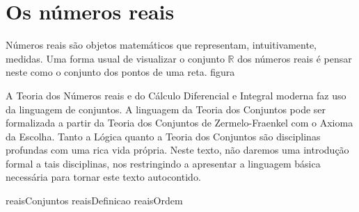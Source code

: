 \chapter{Os números reais}
Números reais são objetos matemáticos que representam, intuitivamente, medidas.
Uma forma usual de visualizar o conjunto $\mathbb R$ dos números reais é pensar neste como o conjunto dos pontos de uma reta.
{figura}

A Teoria dos Números reais e do Cálculo Diferencial e Integral moderna faz uso da linguagem de conjuntos.
A linguagem da Teoria dos Conjuntos pode ser formalizada a partir da Teoria dos Conjuntos de Zermelo-Fraenkel com o Axioma da Escolha.
Tanto a Lógica quanto a Teoria dos Conjuntos são disciplinas profundas com uma rica vida própria.
Neste texto, não daremos uma introdução formal a tais disciplinas, nos restringindo a apresentar a linguagem básica necessária para tornar este texto autocontido.

{reaisConjuntos}
{reaisDefinicao}
{reaisOrdem}
